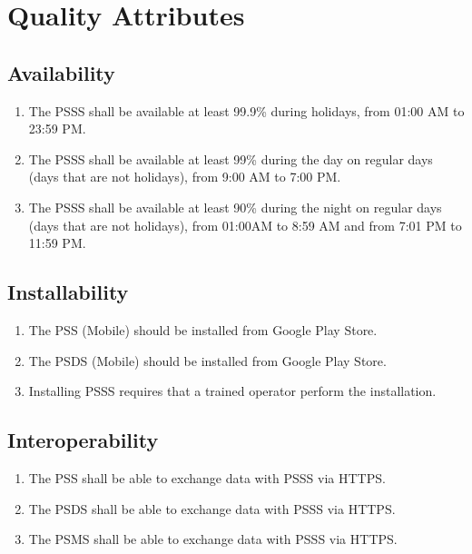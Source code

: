 \section{Quality Attributes}
\subsection{Availability}
\begin{enumerate}[label=AVL-\arabic*]
    \item The PSSS shall be available at least 99.9\% during holidays, 
    from 01:00 AM to 23:59 PM.
    \item The PSSS shall be available at least 99\% during the day on regular 
    days (days that are not holidays), from 9:00 AM to 7:00 PM.
    \item The PSSS shall be available at least 90\% during 
    the night on regular days (days that are not holidays), from 
    01:00AM to 8:59 AM and from 7:01 PM to 11:59 PM.
\end{enumerate}

\subsection{Installability}
\begin{enumerate}[label=INS-\arabic*]
    \item The PSS (Mobile) should be installed from Google Play Store.
    \item The PSDS (Mobile) should be installed from Google Play Store.
    \item Installing PSSS requires that a trained operator perform 
    the installation.
\end{enumerate}

\subsection{Interoperability}
\begin{enumerate}[label=IOP-\arabic*]
    \item The PSS shall be able to exchange data with PSSS via HTTPS.
    \item The PSDS shall be able to exchange data with PSSS via HTTPS.
    \item The PSMS shall be able to exchange data with PSSS via HTTPS.
\end{enumerate}
\pagebreak
